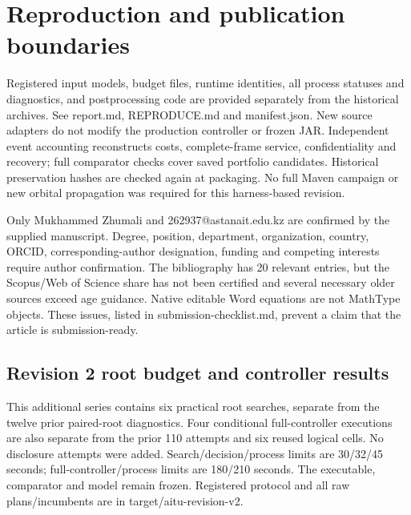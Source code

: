\documentclass[12pt,a4paper]{article}
\begin{document}
\section*{Reproduction and publication boundaries}
Registered input models, budget files, runtime identities, all process statuses and diagnostics, and postprocessing code are provided separately from the historical archives. See report.md, REPRODUCE.md and manifest.json. New source adapters do not modify the production controller or frozen JAR. Independent event accounting reconstructs costs, complete-frame service, confidentiality and recovery; full comparator checks cover saved portfolio candidates. Historical preservation hashes are checked again at packaging. No full Maven campaign or new orbital propagation was required for this harness-based revision.

Only Mukhammed Zhumali and 262937@astanait.edu.kz are confirmed by the supplied manuscript. Degree, position, department, organization, country, ORCID, corresponding-author designation, funding and competing interests require author confirmation. The bibliography has 20 relevant entries, but the Scopus/Web of Science share has not been certified and several necessary older sources exceed age guidance. Native editable Word equations are not MathType objects. These issues, listed in submission-checklist.md, prevent a claim that the article is submission-ready.

\subsection*{Revision 2 root budget and controller results}
This additional series contains six practical root searches, separate from the twelve prior paired-root diagnostics. Four conditional full-controller executions are also separate from the prior 110 attempts and six reused logical cells. No disclosure attempts were added. Search/decision/process limits are 30/32/45 seconds; full-controller/process limits are 180/210 seconds. The executable, comparator and model remain frozen. Registered protocol and all raw plans/incumbents are in target/aitu-revision-v2.
\end{document}

